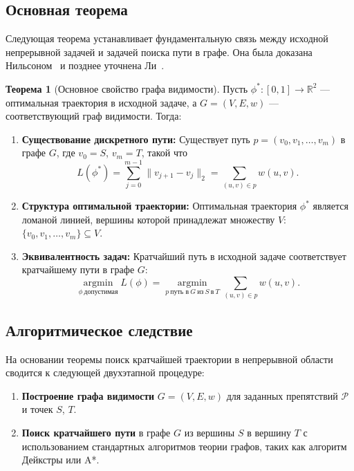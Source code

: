 \documentclass{article}
\theoremstyle{definition}
\newtheorem{theorem}{Теорема}
\begin{document}
\subsection{Основная теорема}

Следующая теорема устанавливает фундаментальную связь между исходной непрерывной задачей и задачей поиска пути в графе.
Она была доказана Нильсоном~\cite{nilsson69} и позднее уточнена Ли~\cite{lee78}.

\begin{theorem}[Основное свойство графа видимости]
Пусть $\phi^*: [0,1] \to \mathbb{R}^2$ --- оптимальная траектория в исходной задаче, а $G = (V, E, w)$ --- соответствующий граф видимости. Тогда:
\begin{enumerate}[label=\textbf{(\arabic*)}]
    \item \textbf{Существование дискретного пути:} Существует путь $p = (v_0, v_1, \dots, v_m)$ в графе $G$, где $v_0 = S$, $v_m = T$, такой что
    \[
    L(\phi^*) = \sum_{j=0}^{m-1} \|v_{j+1} - v_j\|_2 = \sum_{(u,v) \in p} w(u,v).
    \]
    
    \item \textbf{Структура оптимальной траектории:} Оптимальная траектория $\phi^*$ является ломаной линией,
        вершины которой принадлежат множеству $V$: $\{v_0, v_1, \dots, v_m\} \subseteq V$.
    
    \item \textbf{Эквивалентность задач:} Кратчайший путь в исходной задаче соответствует кратчайшему пути в графе $G$:
    \[
    \operatorname*{argmin}_{\phi \ \text{допустимая}} L(\phi) = \operatorname*{argmin}_{p \ \text{путь в} \ G \ \text{из} \ S \ \text{в} \ T} \sum_{(u,v) \in p} w(u,v).
    \]
\end{enumerate}
\end{theorem}

\subsection{Алгоритмическое следствие}

На основании теоремы поиск кратчайшей траектории в непрерывной области сводится к следующей двухэтапной процедуре:

\begin{enumerate}
    \item \textbf{Построение графа видимости} $G = (V, E, w)$ для заданных препятствий $\mathcal{P}$ и точек $S$, $T$.
    \item \textbf{Поиск кратчайшего пути} в графе $G$ из вершины $S$ в вершину $T$ с использованием стандартных алгоритмов теории графов, 
        таких как алгоритм Дейкстры или A*.
\end{enumerate}
\end{document}
